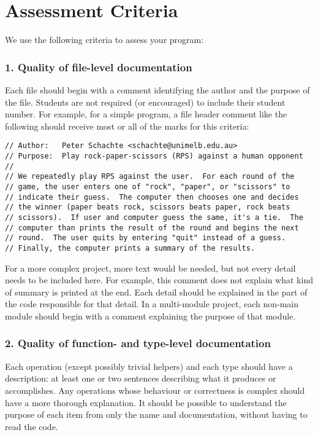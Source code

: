\documentclass[a4paper]{article}
\begin{document}
\section{Assessment Criteria}

We use the following criteria to assess your program:

\subsubsection*{1.  Quality of file-level documentation}

Each file should begin with a comment identifying the author and the
purpose of the file.
Students are not required (or encouraged) to include their student number.
For example, for a simple program, a file header comment like the following
should receive most or all of the marks for this criteria:
\begin{verbatim}
// Author:   Peter Schachte <schachte@unimelb.edu.au>
// Purpose:  Play rock-paper-scissors (RPS) against a human opponent
//
// We repeatedly play RPS against the user.  For each round of the
// game, the user enters one of "rock", "paper", or "scissors" to
// indicate their guess.  The computer then chooses one and decides
// the winner (paper beats rock, scissors beats paper, rock beats
// scissors).  If user and computer guess the same, it's a tie.  The
// computer than prints the result of the round and begins the next
// round.  The user quits by entering "quit" instead of a guess.
// Finally, the computer prints a summary of the results.
\end{verbatim}
For a more complex project, more text would be needed, but not every detail
needs to be included here.  For example, this comment does not explain
what kind of summary is printed at the end.  Each detail should be explained
in the part of the code responsible for that detail.
In a multi-module project, each non-main module should begin with a
comment explaining the purpose of that module.

\subsubsection*{2.  Quality of function- and type-level documentation}
Each operation (except possibly trivial helpers) and
each type should have a description:
at least one or two sentences describing what it produces or
accomplishes.
Any operations whose behaviour or correctness is
complex should have a more thorough explanation.
It should be possible to understand the purpose of each item
from only the name and documentation, without having to read the code.
\end{document}
